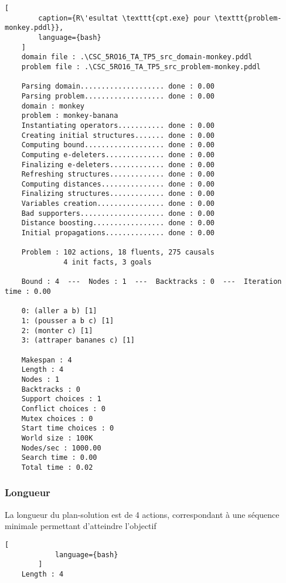\documentclass[../CSC_5RO16_TA_TP5.tex]{subfiles}
\begin{document}
\begin{scriptsize}\mycode
    \begin{lstlisting}[
        caption={R\'esultat \texttt{cpt.exe} pour \texttt{problem-monkey.pddl}},
        language={bash}
    ]
    domain file : .\CSC_5RO16_TA_TP5_src_domain-monkey.pddl
    problem file : .\CSC_5RO16_TA_TP5_src_problem-monkey.pddl
    
    Parsing domain.................... done : 0.00
    Parsing problem................... done : 0.00
    domain : monkey
    problem : monkey-banana
    Instantiating operators........... done : 0.00
    Creating initial structures....... done : 0.00
    Computing bound................... done : 0.00
    Computing e-deleters.............. done : 0.00
    Finalizing e-deleters............. done : 0.00
    Refreshing structures............. done : 0.00
    Computing distances............... done : 0.00
    Finalizing structures............. done : 0.00
    Variables creation................ done : 0.00
    Bad supporters.................... done : 0.00
    Distance boosting................. done : 0.00
    Initial propagations.............. done : 0.00
    
    Problem : 102 actions, 18 fluents, 275 causals
              4 init facts, 3 goals
    
    Bound : 4  ---  Nodes : 1  ---  Backtracks : 0  ---  Iteration time : 0.00
    
    0: (aller a b) [1]
    1: (pousser a b c) [1]
    2: (monter c) [1]
    3: (attraper bananes c) [1]
    
    Makespan : 4
    Length : 4
    Nodes : 1
    Backtracks : 0
    Support choices : 1
    Conflict choices : 0
    Mutex choices : 0
    Start time choices : 0
    World size : 100K
    Nodes/sec : 1000.00
    Search time : 0.00
    Total time : 0.02
    \end{lstlisting}
\end{scriptsize}

\subsubsection{Longueur}
\begin{resolution}
    La longueur du plan-solution est de 4 actions, correspondant à une séquence minimale permettant d'atteindre l'objectif

    \begin{scriptsize}\mycode
        \begin{lstlisting}[
            language={bash}
        ]
    Length : 4
        \end{lstlisting}
    \end{scriptsize}
\end{resolution}
\end{document}
